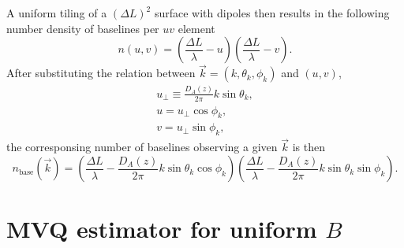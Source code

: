 \documentclass[12pt]{paper}
\newcommand{\beq}{\begin{equation}}
\newcommand{\eeq}{\end{equation}}
\newcommand{\bga}{\begin{gathered}}
\newcommand{\ega}{\end{gathered}}
\begin{document}
A uniform tiling of a $(\Delta L)^2$ surface with dipoles then results in the following number density of baselines per $uv$ element
\beq
n(u,v) = (\frac{\Delta L}{\lambda} - u)(\frac{\Delta L}{\lambda} - v).
\label{eq:nuv_fftt}
\eeq
After substituting the relation between $\vec k=(k,\theta_k,\phi_k)$ and $(u,v)$, 
\beq
\bga
u_\perp \equiv \frac{D_A(z)}{2\pi}k\sin\theta_k,\\
u = u_\perp \cos\phi_k,\\
v = u_\perp \sin\phi_k,
\ega
\label{eq:k_uv}
\eeq
the corresponsing number of baselines observing a given $\vec k$ is then
\beq
n_\text{base}(\vec k) = (\frac{\Delta L}{\lambda} - \frac{D_A(z)}{2\pi}k\sin\theta_k\cos\phi_k)(\frac{\Delta L}{\lambda} - \frac{D_A(z)}{2\pi}k\sin\theta_k\sin\phi_k).
\label{eq:nk_fftt}
\eeq
\section{MVQ estimator for uniform $ B$}
\label{sec:B_estimator}
\end{document}
